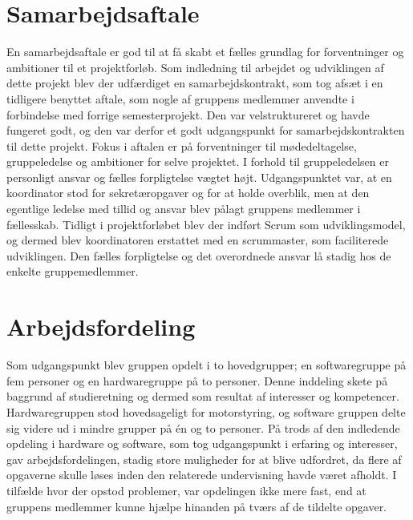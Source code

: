 \section{Samarbejdsaftale}
En samarbejdsaftale er god til at få skabt et fælles grundlag for forventninger og ambitioner til et projektforløb. Som indledning til arbejdet og udviklingen af dette projekt blev der udfærdiget en samarbejdskontrakt, som tog afsæt i en tidligere benyttet aftale, som nogle af gruppens medlemmer anvendte i forbindelse med forrige semesterprojekt. Den var velstruktureret og havde fungeret godt, og den var derfor et godt udgangspunkt for samarbejdskontrakten til dette projekt. Fokus i aftalen er på forventninger til mødedeltagelse, gruppeledelse og ambitioner for selve projektet. I forhold til gruppeledelsen er personligt ansvar og fælles forpligtelse vægtet højt. Udgangspunktet var, at en koordinator stod for sekretæropgaver og for at holde overblik, men at den egentlige ledelse med tillid og ansvar blev pålagt gruppens medlemmer i fællesskab. Tidligt i projektforløbet blev der indført Scrum som udviklingsmodel, og dermed blev koordinatoren erstattet med en scrummaster, som faciliterede udviklingen. Den fælles forpligtelse og det overordnede ansvar lå stadig hos de enkelte gruppemedlemmer.

\section{Arbejdsfordeling}
Som udgangspunkt blev gruppen opdelt i to hovedgrupper; en softwaregruppe på fem personer og en hardwaregruppe på to personer. Denne inddeling skete på baggrund af studieretning og dermed som resultat af interesser og kompetencer. Hardwaregruppen stod hovedsageligt for motorstyring, og software gruppen delte sig videre ud i mindre grupper på én og to personer. På trods af den indledende opdeling i hardware og software, som tog udgangspunkt i erfaring og interesser, gav arbejdsfordelingen, stadig store muligheder for at blive udfordret, da flere af opgaverne skulle løses inden den relaterede undervisning havde været afholdt. I tilfælde hvor der opstod problemer, var opdelingen ikke mere fast, end at gruppens medlemmer kunne hjælpe hinanden på tværs af de tildelte opgaver. \\


